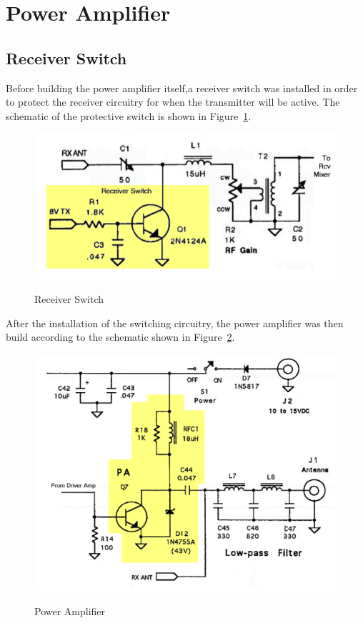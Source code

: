 \section{Power Amplifier}

\subsection{Receiver Switch}
Before building the power amplifier itself,a receiver switch was installed in order
to protect the receiver circuitry for when the transmitter will be active. 
The schematic of the protective switch is shown in
Figure~\ref{fig:RxSwitch}.

\begin{figure}[h!]
  \centering
  \includegraphics[scale=0.8]{./img/RxSwitch.png}
  \label{fig:RxSwitch}
  \caption{Receiver Switch}
\end{figure}

After the installation of the switching circuitry, the power amplifier was then
build according to the schematic shown in Figure~\ref{fig:powamp}.

\begin{figure}[h!]
  \centering
  \includegraphics[scale=0.7]{./img/powamp.png}
  \label{fig:powamp}
  \caption{Power Amplifier}
\end{figure}

